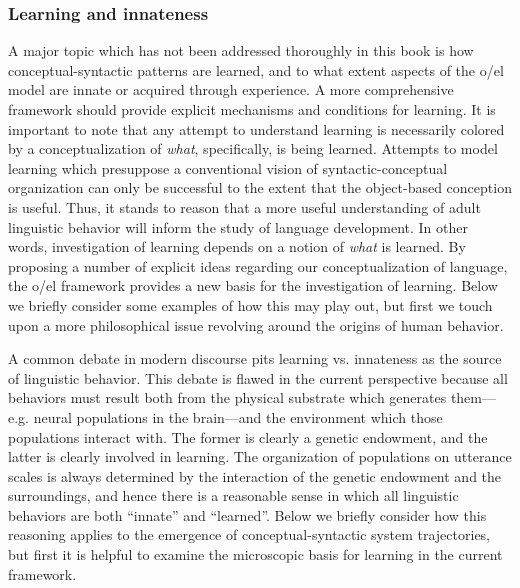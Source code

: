 \subsubsection{Learning and innateness}

A major topic which has not been addressed thoroughly in this book is how conceptual-syntactic patterns are learned, and to what extent aspects of the o/el model are innate or acquired through experience. A more comprehensive framework should provide explicit mechanisms and conditions for learning. It is important to note that any attempt to understand learning is necessarily colored by a conceptualization of \textit{what}, specifically, is being learned. Attempts to model learning which presuppose a conventional vision of syntactic-conceptual organization can only be successful to the extent that the object-based conception is useful. Thus, it stands to reason that a more useful understanding of adult linguistic behavior will inform the study of language development. In other words, investigation of learning depends on a notion of \textit{what} is learned. By proposing a number of explicit ideas regarding our conceptualization of language, the o/el framework provides a new basis for the investigation of learning. Below we briefly consider some examples of how this may play out, but first we touch upon a more philosophical issue revolving around the origins of human behavior.

A common debate in modern discourse pits learning vs. innateness as the source of linguistic behavior. This debate is flawed in the current perspective because all behaviors must result both from the physical substrate which generates them—e.g. neural populations in the brain—and the environment which those populations interact with. The former is clearly a genetic endowment, and the latter is clearly involved in learning. The organization of populations on utterance scales is always determined by the interaction of the genetic endowment and the surroundings, and hence there is a reasonable sense in which all linguistic behaviors are both “innate” and “learned”.  Below we briefly consider how this reasoning applies to the emergence of conceptual-syntactic system trajectories, but first it is helpful to examine the microscopic basis for learning in the current framework.

